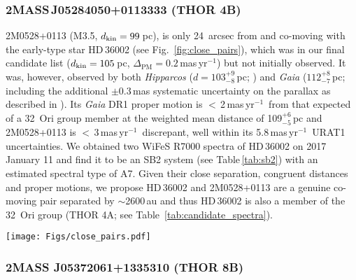 \documentclass[usenatbib]{mnras}
\newcommand{\masyr}{mas\,yr$^{-1}$}
\begin{document}
\subsubsection{2MASS\,J05284050+0113333 (THOR 4B)}
\label{2m0528}

2M0528+0113 (M3.5, $d_{\rm kin}=99$\,pc), is only 24~arcsec from and
co-moving with the early-type star HD\,36002 (see
Fig.~\ref{fig:close_pairs}), which was in our final candidate list
($d_{\rm kin}=105$\,pc, $\Delta_\textrm{PM}=0.2$\,\masyr) but not initially
observed. It was, however, observed by both
\emph{Hipparcos} ($d=103_{-8}^{+9}$\,pc; \citealp{vanLeeuwen07}) and \emph{Gaia}
($112_{-7}^{+8}$\,pc; including the additional $\pm0.3$\,mas systematic
uncertainty on the parallax as described in \citealp{Gaia16}). Its \emph{Gaia} DR1 proper
motion is $<$\,2\,\masyr\ from that expected of a 32~Ori group member at the weighted mean distance of 109$_{-5}^{+6}$\,pc and 2M0528+0113 is $<$\,3\,\masyr\ discrepant, well within its 5.8\,\masyr\ URAT1 uncertainties. We obtained two WiFeS R7000 spectra of HD\,36002 on 2017 January 11 and find it to be an SB2 system (see Table\,\ref{tab:sb2}) with an estimated spectral type of A7. Given
their close separation, congruent distances and proper motions, we
propose HD\,36002 and 2M0528+0113 are a genuine co-moving pair
separated by $\sim$2600\,au and thus HD\,36002 is also a member of the
32~Ori group (THOR 4A; see Table~\ref{tab:candidate_spectra}). 

\begin{figure*}
\centering
\texttt{[image: Figs/close\_pairs.pdf]}
\caption[]{Red Digitized Sky Survey images of the four wide
  pairs confirmed as members of the 32~Ori group during this
  study (the large number in the upper right corner of each image corresponds
  to the THOR number assigned as part of this study; see Table~\ref{tab:candidate_spectra}).
  Each image is $3\times3$\,arcmin and oriented north up, east left. Arrows show the UCAC4 proper motions
  projected over a period of 1000\,yr. Each pair clearly shares a
  common proper motion, in addition to a common distance and radial
  velocity. From left to right, their physical separations are
  approximately 2600, 5500, 3000 and 1600\,au.}
\label{fig:close_pairs}
\end{figure*}

\subsubsection{2MASS J05372061+1335310 (THOR 8B)}
\end{document}
